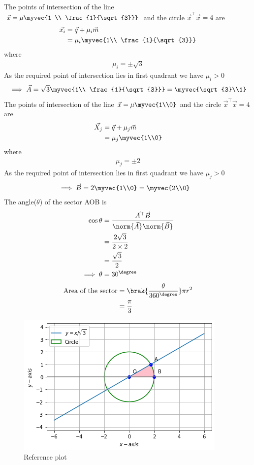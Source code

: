 The points of intersection of the line $\vec{x}=\mu \myvec{1 \\ \frac{1}{\sqrt{3}}}$ and the circle $\vec{x}^\top\vec{x}=4$ are 
\begin{align}
    \vec{x_i}&=\vec{q}+\mu_i\vec{m}\\
             &=\mu_i\myvec{1\\ \frac{1}{\sqrt{3}}}
\end{align}
where 
\begin{align}
    \mu_i = \pm\sqrt{3}
\end{align}
As the required point of intersection lies in first quadrant we have $\mu_i>0$
\begin{align}
    \implies \vec{A}=\sqrt{3}\myvec{1\\ \frac{1}{\sqrt{3}}}=\myvec{\sqrt{3}\\1}
\end{align}
The points of intersection of the line $\vec{x}=\mu\myvec{1\\0}$ and the circle $\vec{x}^\top\vec{x}=4$ are 
\begin{align}
    \vec{X_j}&=\vec{q}+\mu_j\vec{m}\\
             &=\mu_j\myvec{1\\0}
\end{align}
where
\begin{align}
    \mu_j = \pm 2
\end{align}
As the required point of intersection lies in first quadrant we have $\mu_j>0$
\begin{align}
    \implies \vec{B}&=2\myvec{1\\0}=\myvec{2\\0}
\end{align}
The angle($\theta$) of the sector AOB is 
\begin{align}
    \cos{\theta}&=\frac{\vec{A}^{\top}\vec{B}}{\norm{\vec{A}}\norm{\vec{B}}}\\
    &=\frac{2\sqrt{3}}{2\times 2}\\
    &=\frac{\sqrt{3}}{2}\\
    \implies \theta &= 30^{\degree}
\end{align}
\begin{align}
    \text{Area of the sector}&=\brak{\frac{\theta}{360^{\degree}}}\pi r^2\\
    &= \frac{\pi}{3}
\end{align}

\begin{figure}[!h]
 \centering
 \includegraphics[width=\columnwidth]{solutions/oct/2/5/figs/fig.png}
 \caption{Reference plot}
 \label{oct/2/5/plot}
\end{figure}
